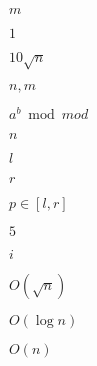 \documentclass{article}
\begin{document}
$m$
\pagebreak

$1$
\pagebreak

$10\sqrt{n}$
\pagebreak

$n, m$
\pagebreak

$a^b\bmod mod$
\pagebreak

$n$
\pagebreak

$l$
\pagebreak

$r$
\pagebreak

$p\in[l, r]$
\pagebreak

$5$
\pagebreak

$i$
\pagebreak

$O(\sqrt n)$
\pagebreak

$O(\log n)$
\pagebreak

$O(n)$
\pagebreak
\end{document}
